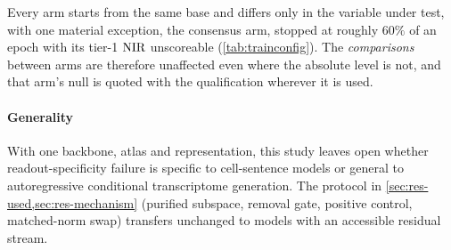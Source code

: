 Every arm starts from the same base and differs only in the variable under test,
with one material exception, the consensus arm, stopped at roughly $60\%$ of an
epoch with its tier-1 $\textrm{NIR}$ unscoreable (\cref{tab:trainconfig}). The
\emph{comparisons} between arms are therefore unaffected even where the absolute
level is not, and that arm's null is quoted with the qualification wherever it
is used.

\paragraph{Generality} With one backbone, atlas and representation, this study
leaves open whether readout-specificity failure is specific to cell-sentence
models or general to autoregressive conditional transcriptome generation.
The protocol in \cref{sec:res-used,sec:res-mechanism} (purified subspace, removal
gate, positive control, matched-norm swap) transfers unchanged to models with
an accessible residual stream.
